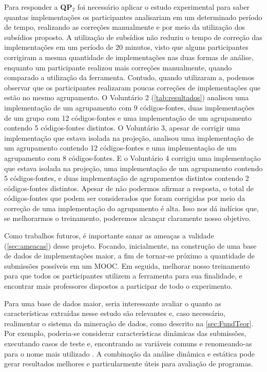 	Para responder a \textbf{QP$_2$} foi necessário aplicar o estudo experimental
	para saber quantas implementações os participantes analisariam em um determinado
	período de tempo, realizando as correções manualmente e por meio da utilização dos
	subsídios proposto. A utilização de subsídios não reduziu o tempo de correção
	das implementações em um período de $20$ minutos, visto que alguns participantes
	corrigiram a mesma quantidade de implementações nas duas formas de análise, enquanto
	um participante realizou mais correções manualmente, quando comparado a utilização
	da ferramenta. Contudo, quando utilizaram a, podemos observar
	que os participantes realizaram poucas correções de implementações que estão no
	mesmo agrupamento. O Voluntário 2 (\cref{tab:resultados}) analisou uma implementação
	de um agrupamento com 9 códigos-fontes, duas implementações de um grupo com 12
	códigos-fontes e uma implementação de um agrupamento contendo 5 códigos-fontes
	distintos. O Voluntário 3, apesar de corrigir uma implementação que estava isolada
	na projeção, analisou uma implementação de um agrupamento contendo 12 códigos-fontes
	e uma implementação de um agrupamento com 8 códigos-fontes. E o Voluntário 4
	corrigiu uma implementação que estava isolada na projeção, uma implementação de
	um agrupamento contendo 5 códigos-fontes, e duas implementação de agrupamentos
	distintos contendo 2 códigos-fontes distintos. Apesar de não podermos afirmar
	a resposta, o total de códigos-fontes que podem ser considerados que foram
	corrigidas por meio da correção de uma implementação do agrupamento é alta. Isso
	nos dá indícios que, se melhorarmos o treinamento, poderemos alcançar claramente
	nosso objetivo.
	
	
	Como trabalhos futuros, é importante sanar as ameaças a validade (\cref{sec:ameacas})
	desse projeto. Focando, inicialmente, na construção de uma base de dados de
	implementações maior, a fim de tornar-se próximo a quantidade de submissões
	possíveis em um \acs{MOOC}. Em seguida, melhorar nosso treinamento para que
	todos os participantes utilizem a ferramenta para sua finalidade, e encontrar
	mais professores dispostos a participar de todo o experimento.
	
	Para uma base de dados maior, seria interessante avaliar o quanto as características
	extraídas nesse estudo são relevantes e, caso necessário, realimentar o
	sistema da mineração de dados, como descrito na \cref{sec:FundTeor}. Por
	exemplo, poderia-se considerar características dinâmicas das submissões, executando
	casos de teste e, encontrando as variáveis
	comuns e renomeando-as para o nome mais utilizado \cite{Glassman:2015}.
	A combinação da análise dinâmica e estática pode gerar resultados melhores e
	particularmente úteis para avaliação de programas.